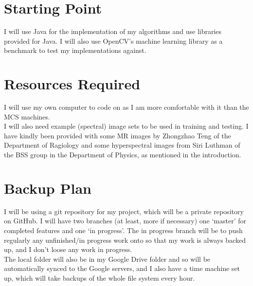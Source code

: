 
\section*{Starting Point}

I will use Java for the implementation of my algorithms and use libraries 
provided for Java. I will also use OpenCV's machine learning library as a 
benchmark to test my implementations against. 




\section*{Resources Required}

I will use my own computer to code on as I am more comfortable with it than the 
MCS machines. \\

I will also need example (spectral) image sets to be used in training and 
testing. I have kindly been provided with some MR images by Zhongzhao Teng of 
the Department of Ragiology and some hyperspectral images from Siri Luthman of 
the BSS group in the Department of Physics, as mentioned in the introduction.




\section*{Backup Plan}

I will be using a git repository for my project, which will be a private 
repository on GitHub. I will have two branches (at least, more if necessary) one 
`master' for completed features and one `in progress'. The in progress branch 
will be to push regularly any unfinished/in progress work onto so that my work 
is always backed up, and I don't loose any work in progress. \\

The local folder will also be in my Google Drive folder and so will be 
automatically synced to the Google servers, and I also have a time machine 
set up, which will take backups of the whole file system every hour.




